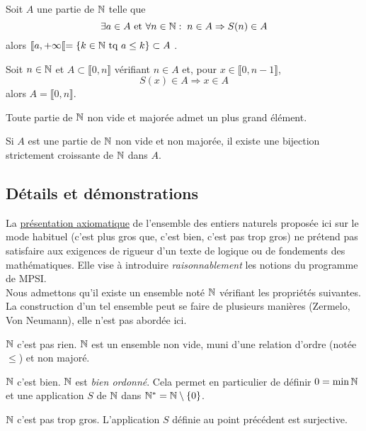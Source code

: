 \begin{propn}\label{pN: Recu}
 Soit $A$ une partie de $\mathbb{N}$ telle que
\begin{displaymath}
 \exists a \in A \text{ et } \forall n \in \mathbb{N} :\; n\in A \Rightarrow S(n) \in A
\end{displaymath}
alors $\llbracket a , +\infty\llbracket =\left\lbrace k\in \mathbb{N} \text{ tq } a\leq k\right\rbrace \subset A$ .
\end{propn}

\begin{propn}\label{pN: RecD}
 Soit $n\in \mathbb{N}$ et $A\subset \llbracket 0,n \rrbracket$ vérifiant $n\in A$ et, pour $x\in \llbracket 0,n-1 \rrbracket$, 
\begin{displaymath}
 S(x) \in A \Rightarrow x \in A
\end{displaymath}
alors $A=\llbracket 0,n \rrbracket$.
\end{propn}

\begin{propn}\label{pN: Max}
 Toute partie de $\mathbb{N}$ non vide et majorée admet un plus grand élément.
\end{propn}

\begin{propn}\label{pN: PasMaj}
Si $A$ est une partie de $\mathbb{N}$ non vide et non majorée, il existe une bijection strictement croissante de $\mathbb{N}$ dans $A$.  
\end{propn}


\subsection{Détails et démonstrations}
La \href{http://back.maquisdoc.net/v-1/index.php?&act=chvueelt&vue=vue_rech1&id_elt=6528}{présentation axiomatique} de l'ensemble des entiers naturels proposée ici sur le mode habituel (\og c'est plus gros que\fg, \og c'est bien\fg, \og c'est pas trop gros\fg) ne prétend pas satisfaire aux exigences de rigueur d'un texte de logique ou de fondements des mathématiques. Elle vise à introduire \emph{raisonnablement} les notions du programme de MPSI.\\ 
Nous admettons qu'il existe un ensemble noté $\mathbb{N}$ vérifiant les propriétés suivantes. La construction d'un tel ensemble peut se faire de plusieurs manières (Zermelo, Von Neumann), elle n'est pas abordée ici.

\begin{pa}
\item[$\mathbb{N}$ c'est pas rien.]  $\mathbb{N}$ est un ensemble non vide, muni d'une relation d'ordre (notée $\leq$) et non majoré.
 \item[$\mathbb{N}$ c'est bien.] $\mathbb{N}$ est \emph{bien ordonné}. Cela permet en particulier de définir $0=\min \mathbb{N}$ et une application $S$ de $\mathbb{N}$ dans $\mathbb{N}^*=\mathbb{N} \setminus\{0\}$.
\item[$\mathbb{N}$ c'est pas trop gros.] L'application $S$ définie au point précédent est surjective.
\end{pa}


